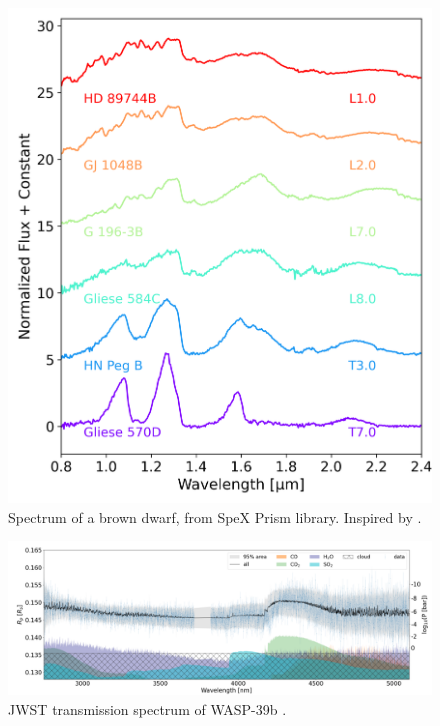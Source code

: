 \begin{figure}[]
\begin{center}
	\includegraphics[width=\linewidth]{fig/bdspectra.png}
\end{center}
\caption{Spectrum of a brown dwarf, from SpeX Prism library.  Inspired by \cite{2025ApJ...988...31L}.}
\label{fig:bd}
\end{figure}

\begin{figure}[htb]
\begin{center}
	\includegraphics[width=\linewidth]{fig/jwst_spectrum.png}
\end{center}
\caption{JWST transmission spectrum of WASP-39b \cite{2025ApJ...985..263K}.}
\label{fig:jwst}
\end{figure}

